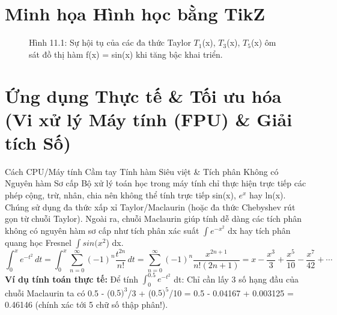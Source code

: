 \documentclass[11pt,a4paper,oneside]{book}
\begin{document}
\section{Minh họa Hình học bằng TikZ}
\begin{figure}[htbp]
\centering
{}
\caption{Hình 11.1: Sự hội tụ của các đa thức Taylor $T_1$(x), $T_3$(x), $T_5$(x) ôm sát đồ thị hàm f(x) = sin(x) khi tăng bậc khai triển.}
\label{fig:tikz-ch11-taylor}
\end{figure}

\section{Ứng dụng Thực tế \& Tối ưu hóa (Vi xử lý Máy tính (FPU) \& Giải tích Số)}
\begin{ungdung}{Cách CPU/Máy tính Cầm tay Tính hàm Siêu việt \& Tích phân Không có Nguyên hàm Sơ cấp}
Bộ xử lý toán học trong máy tính chỉ thực hiện trực tiếp các phép cộng, trừ, nhân, chia nên không thể tính trực tiếp sin(x), $e^x$ hay ln(x). Chúng sử dụng đa thức xấp xỉ Taylor/Maclaurin (hoặc đa thức Chebyshev rút gọn từ chuỗi Taylor). Ngoài ra, chuỗi Maclaurin giúp tính dễ dàng các tích phân không có nguyên hàm sơ cấp như tích phân xác suất $\int e^{-x^2}$ dx hay tích phân quang học Fresnel $\int sin(x^2$) dx.
\[ \int_0^x e^{-t^2}\,dt = \int_0^x \sum_{n=0}^\infty (-1)^n \frac{t^{2n}}{n!}\,dt = \sum_{n=0}^\infty (-1)^n \frac{x^{2n+1}}{n!(2n+1)} = x - \frac{x^3}{3} + \frac{x^5}{10} - \frac{x^7}{42} + \cdots \]
\noindent\textbf{Ví dụ tính toán thực tế:} Để tính $\int_0^{0.5} e^{-t^2}$ dt: Chỉ cần lấy 3 số hạng đầu của chuỗi Maclaurin ta có 0.5 - (0.$5)^3$/3 + (0.$5)^5$/10 = 0.5 - 0.04167 + 0.003125 = 0.46146 (chính xác tới 5 chữ số thập phân!).
\end{ungdung}
\end{document}

